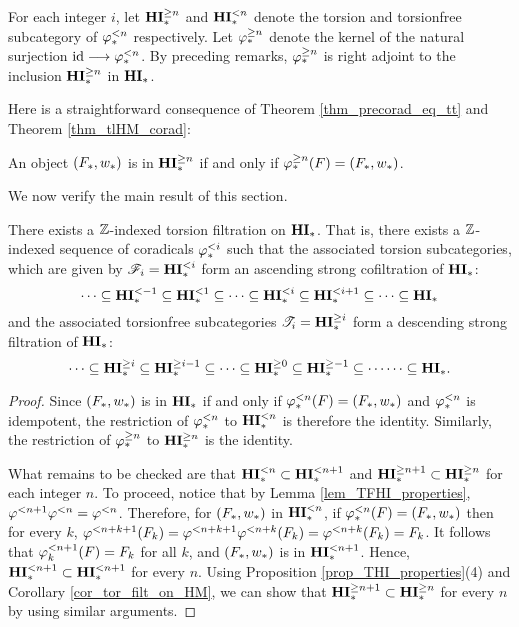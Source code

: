 \begin{defn}
For each integer $i$, let $\THM{n}$ and $\TFHM{n}$ denote the 
torsion and torsionfree subcategory of $\tlHM{n}$ respectively.
Let $\tgHM{n}$ denote the kernel of the natural surjection
$\id \to \tlHM{n}$. By preceding remarks, $\tgHM{n}$ is right
adjoint to the inclusion $\THM{n}$ in $\HM$.
\end{defn}

Here is a straightforward consequence of Theorem
\ref{thm_precorad_eq_tt} and Theorem \ref{thm_tlHM_corad}:

\begin{cor}\label{cor_tgHM_prop}
An object $(F_*, \deloop_*)$ is in $\THM{n}$ if and only
if $\tgHM{n}(F) = (F_*, \deloop_*)$.
\end{cor}

We now verify the main result of this section.

\begin{cor}\label{cor_tor_filt_on_HM}
There exists a $\Z$-indexed torsion filtration on $\HM$. That 
is, there exists a $\Z$-indexed sequence of coradicals $\tlHM{i}$
such that the associated torsion subcategories, which are given
by $\Cat{F}_i = \TFHM{i}$
form an ascending strong cofiltration of $\HM$:
\[
\cdots \subseteq \TFHM{-1} \subseteq \TFHM{1} \subseteq \cdots 
   \subseteq \TFHM{i} \subseteq \TFHM{i + 1} \subseteq \cdots 
   \subseteq \HM
\]
and the associated torsionfree subcategories $\Cat{T}_i = \THM{i}$
form a descending strong filtration of $\HM$:
\[
\cdots \subseteq \THM{i} \subseteq \THM{i - 1} \subseteq 
   \cdots \subseteq \THM{0} \subseteq \THM{-1} \subseteq \cdots
   \cdots \subseteq \HM.
\]
\end{cor}
\begin{proof}
Since $(F_*, \deloop_*)$ is in $\HM$ if and only if $\tlHM{n}(F) =
(F_*, \deloop_*)$ and $\tlHM{n}$ is idempotent, the restriction
of $\tlHM{n}$ to $\TFHM{n}$ is therefore the identity. Similarly,
the restriction of $\tgHM{n}$ to $\THM{n}$ is the identity.

What remains to be checked are that $\TFHM{n} \subset \TFHM{n + 1}$
and $\THM{n + 1} \subset \THM{n}$ for each integer $n$. To 
proceed, notice that by Lemma \ref{lem_TFHI_properties}, 
$\tlHI{n + 1}\tlHI{n} = \tlHI{n}$. Therefore, for $(F_*, 
\deloop_*)$ in $\TFHM{n}$, if $\tlHM{n}(F) = (F_*, \deloop_*)$ 
then for every $k$, $\tlHI{n + k + 1}(F_k) = \tlHI{n + k + 1}\tlHI{n + k}(F_k) = 
\tlHI{n + k}(F_k) = F_k$. It follows that $\tlHM[k]{n + 1}(F) = 
F_k$ for all $k$, and $(F_*, \deloop_*)$ is in $\TFHM{n + 1}$.
Hence, $\TFHM{n + 1} \subset \TFHM{n + 1}$ for every $n$. Using 
Proposition \ref{prop_THI_properties}(4) and Corollary 
\ref{cor_tor_filt_on_HM}, we can show that $\THM{n + 1} \subset 
\THM{n}$ for every $n$ by using similar arguments.
\end{proof}

